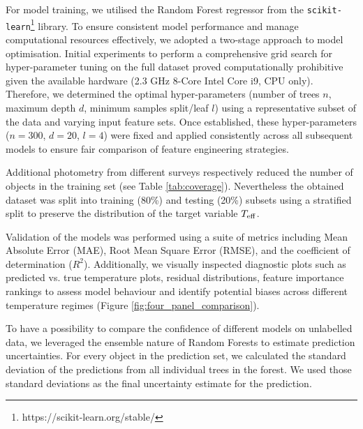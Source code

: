 \documentclass[preprint,12pt,authoryear]{elsarticle}
\begin{document}
For model training, we utilised the Random Forest regressor \citep{RF} from the \texttt{scikit-learn}\footnote{https://scikit-learn.org/stable/} library. To ensure consistent model performance and manage computational resources effectively, we adopted a two-stage approach to model optimisation. 
Initial experiments to perform a comprehensive grid search for hyper-parameter tuning on the full dataset proved computationally prohibitive given the available hardware (2.3 GHz 8-Core Intel Core i9, CPU only). 
Therefore, we determined the optimal hyper-parameters (number of trees $n$, maximum depth $d$, minimum samples split/leaf $l$) using a representative subset of the data and varying input feature sets. 
Once established, these hyper-parameters ($n=300$, $d=20$, $l=4$) were fixed and applied consistently across all subsequent models to ensure fair comparison of feature engineering strategies.

Additional photometry from different surveys respectively reduced the number of objects in the training set (see Table \ref{tab:coverage}).
Nevertheless the obtained dataset was split into training (80\%) and testing (20\%) subsets using a stratified split to preserve the distribution of the target variable $T_{\rm eff}$. 

Validation of the models was performed using a suite of metrics including Mean Absolute Error (MAE), Root Mean Square Error (RMSE), and the coefficient of determination ($R^2$). 
Additionally, we visually inspected diagnostic plots such as predicted vs. true temperature plots, residual distributions, feature importance rankings to assess model behaviour and identify potential biases across different temperature regimes (Figure \ref{fig:four_panel_comparison}).

To have a possibility to compare the confidence of different models on unlabelled data, we leveraged the ensemble nature of Random Forests to estimate prediction uncertainties. 
For every object in the prediction set, we calculated the standard deviation of the predictions from all individual trees in the forest. 
We used those standard deviations as the final uncertainty estimate for the prediction.
\end{document}
